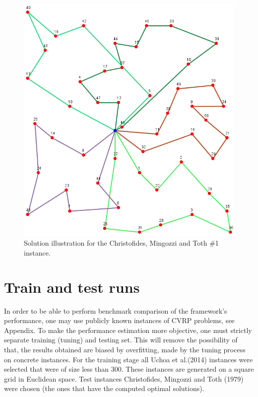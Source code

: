 \documentclass[12pt,a4paper,oneside]{book}
\begin{document}
\begin{figure}[h]
  \centering
    \includegraphics[scale=0.61]{CMT1.PNG}
  \caption{Solution illustration for the Christofides, Mingozzi and Toth \#1 instance.}
  \label{fig:cmt1-illustration}
\end{figure}

\section{Train and test runs}

In order to be able to perform benchmark comparison of the framework's performance, one may use publicly known instances of CVRP problems, see Appendix. To make the performance estimation more objective, one must strictly separate training (tuning) and testing set. This will remove the possibility of that, the results obtained are biased by overfitting, made by the tuning process on concrete instances. For the training stage all Uchoa et al.(2014) instances were selected that were of size less than 300. These instances are generated on a square grid in Euclidean space. Test instances Christofides, Mingozzi and Toth (1979) were chosen (the ones that have the computed optimal solutions).
\end{document}
